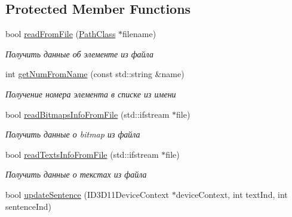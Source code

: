 \subsection*{Protected Member Functions}
\begin{DoxyCompactItemize}
\item 
bool \hyperlink{class_list_element_class_a92e91862b4f1a5280d9465f90a7eefb5}{read\+From\+File} (\hyperlink{class_path_class}{Path\+Class} $\ast$filename)
\begin{DoxyCompactList}\small\item\em Получить данные об элементе из файла \end{DoxyCompactList}\item 
int \hyperlink{class_list_element_class_ab99933bcda68a80155f6bcfe74a6dd61}{get\+Num\+From\+Name} (const std\+::string \&name)
\begin{DoxyCompactList}\small\item\em Получение номера элемента в списке из имени \end{DoxyCompactList}\item 
bool \hyperlink{class_interface_element_class_a80958e5556a2970645b65a56431c88ca}{read\+Bitmaps\+Info\+From\+File} (std\+::ifstream $\ast$file)
\begin{DoxyCompactList}\small\item\em Получить данные о bitmap из файла \end{DoxyCompactList}\item 
bool \hyperlink{class_interface_element_class_afc8ee340b6aa0b99e3280b424aa5c519}{read\+Texts\+Info\+From\+File} (std\+::ifstream $\ast$file)
\begin{DoxyCompactList}\small\item\em Получить данные о текстах из файла \end{DoxyCompactList}\item 
bool \hyperlink{class_interface_element_class_aa1908c476bd6d840acd22dd137fcbd00}{update\+Sentence} (I\+D3\+D11\+Device\+Context $\ast$device\+Context, int text\+Ind, int sentence\+Ind)
\end{DoxyCompactItemize}
